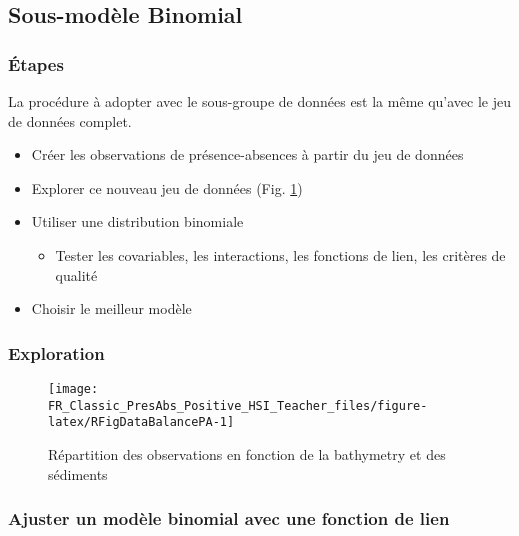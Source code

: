 \documentclass[french,a4paper]{article}
\providecommand{\tightlist}{%
  \setlength{\itemsep}{0pt}\setlength{\parskip}{0pt}}
\begin{document}
\hypertarget{sous-modele-binomial}{%
\subsection{Sous-modèle Binomial}\label{sous-modele-binomial}}

\hypertarget{etapes-2}{%
\subsubsection{Étapes}\label{etapes-2}}

La procédure à adopter avec le sous-groupe de données est la même qu'avec le jeu de données complet.

\begin{itemize}
\tightlist
\item
  Créer les observations de présence-absences à partir du jeu de données
\item
  Explorer ce nouveau jeu de données (Fig. \ref{fig:RFigDataBalancePA})
\item
  Utiliser une distribution binomiale

  \begin{itemize}
  \tightlist
  \item
    Tester les covariables, les interactions, les fonctions de lien, les critères de qualité
  \end{itemize}
\item
  Choisir le meilleur modèle
\end{itemize}

\hypertarget{exploration-1}{%
\subsubsection{Exploration}\label{exploration-1}}



\begin{figure}[!h]

{\centering \texttt{[image: FR\_Classic\_PresAbs\_Positive\_HSI\_Teacher\_files/figure-latex/RFigDataBalancePA-1]} 

}

\caption{Répartition des observations en fonction de la bathymetry et des sédiments}\label{fig:RFigDataBalancePA}
\end{figure}

\hypertarget{ajuster-un-modele-binomial-avec-une-fonction-de-lien}{%
\subsubsection{Ajuster un modèle binomial avec une fonction de lien}\label{ajuster-un-modele-binomial-avec-une-fonction-de-lien}}
\end{document}
